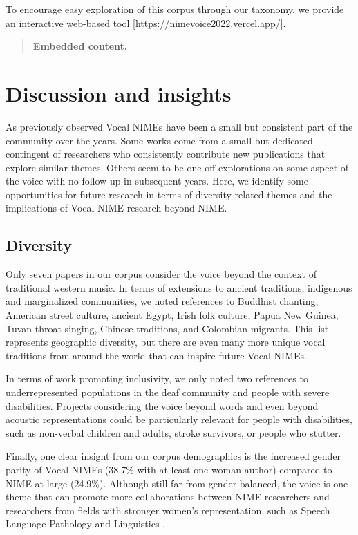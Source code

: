 \documentclass[sigconf]{nimeart}
\begin{document}
To encourage easy exploration of this corpus through our taxonomy, we provide an interactive web-based tool {[}\href{}{https://nimevoice2022.vercel.app/}{]}.


\begin{quote}\small\textbf{Embedded content.}  \end{quote}


\section{\texorpdfstring{\textbf{Discussion and insights}}{Discussion and insights}}\label{discussion-and-insights}

As previously observed Vocal NIMEs have been a small but consistent part of the community over the years. Some works come from a small but dedicated contingent of researchers who consistently contribute new publications that explore similar themes. Others seem to be one-off explorations on some aspect of the voice with no follow-up in subsequent years. Here, we identify some opportunities for future research in terms of diversity-related themes and the implications of Vocal NIME research beyond NIME.

\subsection{\texorpdfstring{Diversity \textbf{}}{Diversity }}\label{diversity}

Only seven papers in our corpus consider the voice beyond the context of traditional western music. In terms of extensions to ancient traditions, indigenous and marginalized communities, we noted references to Buddhist chanting, American street culture, ancient Egypt, Irish folk culture, Papua New Guinea, Tuvan throat singing, Chinese traditions, and Colombian migrants. This list represents geographic diversity, but there are even many more unique vocal traditions from around the world that can inspire future Vocal NIMEs.

In terms of work promoting inclusivity, we only noted two references to underrepresented populations in the deaf community and people with severe disabilities. Projects considering the voice beyond words and even beyond acoustic representations could be particularly relevant for people with disabilities, such as non-verbal children and adults, stroke survivors, or people who stutter.

Finally, one clear insight from our corpus demographics is the increased gender parity of Vocal NIMEs (38.7\% with at least one woman author) compared to NIME at large (24.9\%). Although still far from gender balanced, the voice is one theme that can promote more collaborations between NIME researchers and researchers from fields with stronger women's representation, such as Speech Language Pathology\cite{boyd2001gender} and Linguistics \cite{schrader2021state}.
\end{document}
